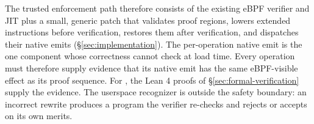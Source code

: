 The trusted enforcement path therefore consists of the existing eBPF verifier and JIT plus a small, generic \tool patch that validates proof regions, lowers extended instructions before verification, restores them after verification, and dispatches their native emits (\S\ref{sec:implementation}).
The per-operation native emit is the one component whose correctness \tool cannot check at load time.
Every operation must therefore supply evidence that its native emit has the same eBPF-visible effect as its proof sequence.
For \lang, the Lean 4 proofs of \S\ref{sec:formal-verification} supply the evidence.
The userspace recognizer is outside the safety boundary: an incorrect rewrite produces a program the verifier re-checks and rejects or accepts on its own merits.






